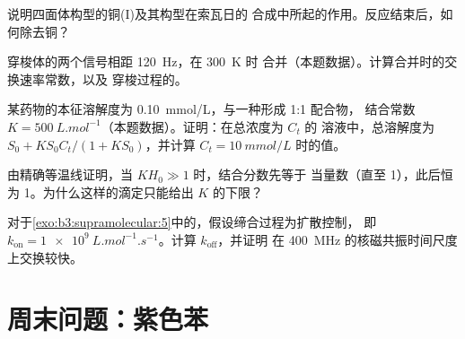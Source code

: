 \begin{exercise}[$\star\star$]\label{exo:b3:supramolecular:8}
说明四面体构型的铜(I)及其构型在索瓦日的
合成中所起的作用。反应结束后，如何除去铜？
\end{exercise}

\begin{exercise}[$\star\star$]\label{exo:b3:supramolecular:9}
穿梭体的两个信号相距 \qty{120}{Hz}，在 \qty{300}{K} 时
合并（本题数据）。计算合并时的交换速率常数，以及
穿梭过程的。
\end{exercise}

\begin{exercise}[$\star\star\star$]\label{exo:b3:supramolecular:10}
某药物的本征溶解度为 \qty{0.10}{mmol/L}，与一种形成 1:1 配合物，
结合常数 $K = \qty{500}{L.mol^{-1}}$（本题数据）。证明：在总浓度为 $C_t$ 的
溶液中，总溶解度为 $S_0 + KS_0C_t/(1 + KS_0)$，并计算 $C_t = \qty{10}{mmol/L}$ 时的值。
\end{exercise}

\begin{exercise}[$\star\star\star$]\label{exo:b3:supramolecular:11}
由精确等温线证明，当 $KH_0 \gg 1$ 时，结合分数先等于
当量数（直至 1），此后恒为 1。为什么这样的滴定只能给出
$K$ 的下限？
\end{exercise}

\begin{exercise}[$\star\star\star$]\label{exo:b3:supramolecular:12}
对于\cref{exo:b3:supramolecular:5}中的，假设缔合过程为扩散控制，
即 $k_{\mathrm{on}} = \qty{1e9}{L.mol^{-1}.s^{-1}}$。计算 $k_{\mathrm{off}}$，并证明
在 \qty{400}{MHz} 的核磁共振时间尺度上交换较快。
\end{exercise}

\section{周末问题：紫色苯}

